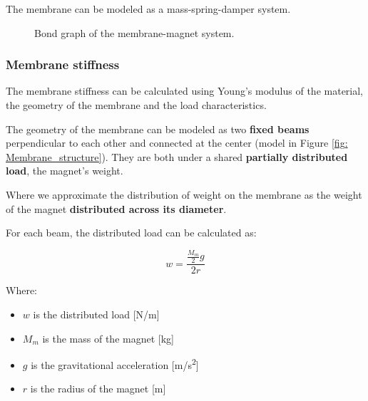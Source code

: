 \begin{samepage}
    The membrane can be modeled as a mass-spring-damper system.
    \nopagebreak    

    \begin{figure}[H]
        \centering
        \caption{Bond graph of the membrane-magnet system.}
        \label{fig:Membrane_bond_graph}
    \end{figure}
\end{samepage}

\subsubsection{Membrane stiffness}
\label{sec: Membrane_stiffness}
The membrane stiffness can be calculated using Young's modulus of the material, the geometry of the membrane and the load characteristics.

The geometry of the membrane can be modeled as two \textbf{fixed beams} perpendicular to each other and connected at the center (model in Figure \ref{fig: Membrane_structure}).
They are both under a shared \textbf{partially distributed load}, the magnet's weight.

Where we approximate the distribution of weight on the membrane as the weight of the magnet \textbf{distributed across its diameter}.

\begin{samepage}
    For each beam, the distributed load can be calculated as:
    \nopagebreak

    \begin{equation}
        w = \frac{\frac{M_{m}}{2} g}{2 r}
    \end{equation}
    \nopagebreak

    Where:
    \nopagebreak

    \begin{itemize}
        \item $w$ is the distributed load [N/m]
        \item $M_m$ is the mass of the magnet [kg]
        \item $g$ is the gravitational acceleration [m/s\textsuperscript{2}]
        \item $r$ is the radius of the magnet [m]
    \end{itemize}
\end{samepage}


